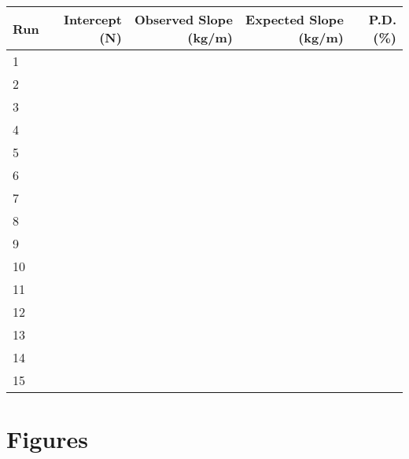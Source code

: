\begin{table}
    \centering
    \begin{tabular}{|l|r|r|r|r|}
        \hline
        Run & Intercept (N) & Observed Slope (kg/m) & Expected Slope (kg/m) & P.D. (\%) \\
        \hline
        1 & & & & \\
        2 & & & & \\
        3 & & & & \\
        \hline
        4 & & & & \\
        5 & & & & \\
        6 & & & & \\
        \hline
        7 & & & & \\
        8 & & & & \\
        9 & & & & \\
        \hline
        10 & & & & \\
        11 & & & & \\
        12 & & & & \\
        \hline
        13 & & & & \\
        14 & & & & \\
        15 & & & & \\
        \hline
    \end{tabular}
\end{table}
\FloatBarrier
\newpage
\section{Figures}
